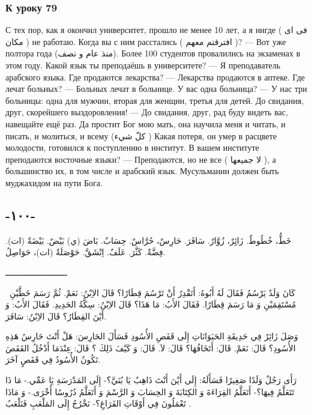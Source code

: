 \documentclass[a5paper]{article}
\begin{document}
\subsubsection{К уроку 79}
С тех пор, как я окончил университет, прошло не менее 10 лет, а я нигде ( فى اى مكان ) не работаю. Когда вы с ним расстались ( افترقتم معهم )? — Вот уже полтора года (منذ عام و نصف). Более 100 студентов провалились на экзаменах в этом году. Какой язык ты преподаёшь в университете? — Я преподаватель арабского языка. Где продаются лекарства? — Лекарства продаются в аптеке. Где лечат больных? — Больных лечат в больнице. У вас одна больница? — У нас три больницы: одна для мужчин, вторая для женщин, третья для детей. До свидания, друг, скорейшего выздоровления! — До свидания, друг, рад буду видеть вас, навещайте ещё раз. Да простит Бог мою мать, она научила меня и читать, и писать, и молиться, и всему (كلّ شيء ) Какая потеря, он умер в расцвете молодости, готовился к поступлению в институт. В вашем институте преподаются восточные языки? — Преподаются, но не все ( لا جميعها ), а большинство их, в том числе и арабский язык. Мусульманин должен быть муджахидом на пути Бога.

\subsection[-١٠٠-]{-١٠٠-}
خَطٌّ، خُطُوطٌ. زَائِِرٌ، زُوَّارٌ. سَافَرَ. حَارِسٌ، حُرَّاسٌ. حِسَابٌ. بَاضَ (ي) بَيْضٌ. بَيْضَةٌ (ات). فِضَّةٌ. كَثَّرَ. عَلَفٌ. اِنْشَقَّ. حَوْصَلَةٌ (ات)، حَوَاصِلُ.

ـــــــــــــــــــــــــ

\ كَانَ وَلَدٌ يَرْسُمُ فَقَالَ لَهُ أَبُوهُ: أَتَقْدِرُ أَنْ تَرْسُمَ قِطَارًا؟ قَالَ الاِبْنُ: نَعَمْ. ثُمَّ رَسَمَ خَطَّيْنِ مُسْتَقِمَيْنِ وَ مَا رَسَمَ قِطَارًا. فَقَالَ الأَبُ: مَا هَذَا؟ قَالَ الاِبْنُ: سِكَّةُ الحَدِيدِ. فَقَالَ الأَبُ: وَ أَيْنَ القِطَارُ؟ قَالَ الاِبْنُ: سَافَرَ.

وَصَلَ زَائِرٌ فِي حَدِيقَةِ الحَيَوَانَاتِ إِلَى قَفَصِ الأُسُودِ فَسَأَلَ الحَارِسَ: هَلْ أَنْتَ حَارِسُ هَذِهِ الأُسُودِ؟ قَالَ: نَعَمْ. قَالَ: أَتَخَافُهَا؟ قَالَ: لاَ. قَالَ: وَ كَيْفَ ذَلِكَ ؟ قَالَ: عِنْدَمَا أَدْخُلُ القَفَصَ تَكُونُ الأُسُودُ فِي قَفَصٍ آخَرَ.

رَأَى رَجُلٌ وَلَدًا صَغِيرًا فَسَأَلَهُ: إِلَى أَيْنَ أَنْتَ ذَاهِبٌ يَا بُنَيَّ؟- إِلَى المَدْرَسَةِ يَا عَمِّي.- مَا ذَا تَتَعَلَّمُ فِيهَا؟- أَتَعَلَّمُ القِرَاءَةَ وَ الكِتَابَةَ وَ الحِسَابَ وَ الرَّسْمَ وَ أَتَعَلَّمُ دُرُوسًا أُخْرَى.- وَ مَاذَا تَعْمَلُونَ فِي أَوْقَاتِ الفَرَاغِ؟- نَخْرُجُ إِلَى المَلْعَبِ فَنَلْعَبُ .
\end{document}
